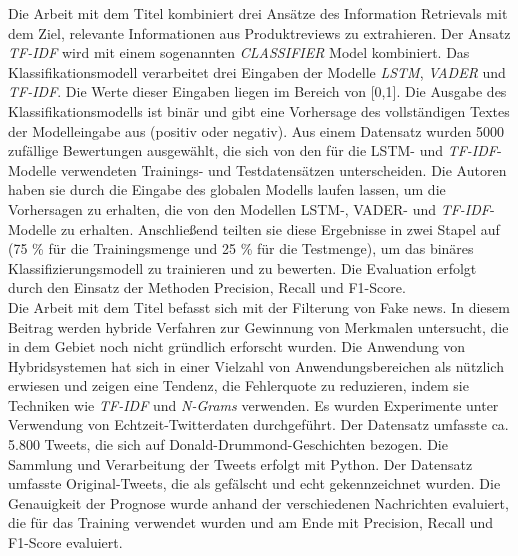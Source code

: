 Die Arbeit mit dem Titel \cite{chiny2021lstm} kombiniert drei Ansätze des Information Retrievals mit dem Ziel, relevante Informationen aus Produktreviews zu extrahieren. Der Ansatz \emph{TF-IDF} wird mit einem sogenannten \emph{CLASSIFIER} Model kombiniert. Das Klassifikationsmodell verarbeitet drei Eingaben der Modelle \emph{LSTM}, \emph{VADER} und \emph{TF-IDF}. Die Werte dieser Eingaben liegen im Bereich von [0,1]. Die Ausgabe des Klassifikationsmodells ist binär und gibt eine Vorhersage des vollständigen Textes der Modelleingabe aus (positiv oder negativ). Aus einem Datensatz wurden 5000 zufällige Bewertungen ausgewählt, die sich von den für die LSTM- und \emph{TF-IDF}-Modelle verwendeten Trainings- und Testdatensätzen unterscheiden. Die Autoren haben sie durch die Eingabe des globalen Modells laufen lassen, um die Vorhersagen zu erhalten, die von den Modellen LSTM-, VADER- und \emph{TF-IDF}-Modelle zu erhalten. Anschließend teilten sie diese Ergebnisse in zwei Stapel auf (75 \% für die Trainingsmenge und 25 \% für die Testmenge), um das binäres Klassifizierungsmodell zu trainieren und zu bewerten. Die Evaluation erfolgt durch den Einsatz der Methoden Precision, Recall und F1-Score.\\

Die Arbeit mit dem Titel \cite{suhasini2021hybrid} befasst sich mit der Filterung von Fake news. In diesem Beitrag werden hybride Verfahren zur Gewinnung von Merkmalen untersucht, die in dem Gebiet noch nicht gründlich erforscht wurden. Die Anwendung von Hybridsystemen hat sich in einer Vielzahl von Anwendungsbereichen als nützlich erwiesen und zeigen eine Tendenz, die Fehlerquote zu reduzieren, indem sie Techniken wie \emph{TF-IDF} und \emph{N-Grams} verwenden. Es wurden Experimente unter Verwendung von Echtzeit-Twitterdaten durchgeführt. Der Datensatz umfasste ca. 5.800 Tweets, die sich auf Donald-Drummond-Geschichten bezogen. Die Sammlung und Verarbeitung der Tweets erfolgt mit Python. Der Datensatz umfasste Original-Tweets, die als gefälscht und echt gekennzeichnet wurden. Die Genauigkeit der Prognose wurde anhand der verschiedenen Nachrichten evaluiert, die für das Training verwendet wurden und am Ende mit Precision, Recall und F1-Score evaluiert.\\

